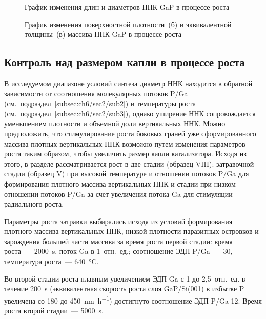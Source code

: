 \begin{figure}[ht]
	\caption{График изменения длин и диаметров ННК GaP в процессе роста}\label{fig:Image_43_1}
\end{figure}

\begin{figure}[ht]
	\caption{График изменения поверхностной плотности~(б) и эквивалентной толщины~(в) массива ННК GaP в процессе роста}\label{fig:Image_43_23}
\end{figure}

\subsection{Контроль над размером капли в процессе роста}\label{subsec:ch6/sec2/sub5}

В исследуемом диапазоне условий синтеза диаметр ННК находится в обратной зависимости от соотношения молекулярных потоков P/Ga (см.~подраздел~\cref{subsec:ch6/sec2/sub2}) и температуры роста (см.~подраздел~\cref{subsec:ch6/sec2/sub3}), однако уширение ННК сопровождается уменьшением плотности и объемной доли вертикальных ННК. Можно предположить, что стимулирование роста боковых граней уже сформированного массива плотных вертикальных ННК возможно путем изменения параметров роста таким образом, чтобы увеличить размер капли катализатора. Исходя из этого, в разделе рассматривается рост в две стадии (образец VIII): затравочной стадии (образец V) при высокой температуре и отношении потоков P/Ga для формирования плотного массива вертикальных ННК и стадии при низком отношении потоков P/Ga за счет увеличения потока Ga для стимуляции радиального роста.

Параметры роста затравки выбирались исходя из условий формирования плотного массива вертикальных ННК, низкой плотности паразитных островков и зарождения большей части массива за время роста первой стадии: время роста~--- 2000~\si{\second}, поток Ga в 1~отн.~ед.; соотношение ЭДП P/Ga~--- 30, температура роста~--- 640~\si{\degreeCelsius}.

Во второй стадии роста плавным увеличением ЭДП Ga с 1 до 2,5~отн.~ед. в течение 200~\si{\second} (эквивалентная скорость роста слоя GaP/Si(001) в избытке P увеличена со 180 до 450~\si{\nano\meter\per\hour}) достигнуто соотношение ЭДП P/Ga 12. Время роста второй стадии~--- 5000~\si{\second}.

